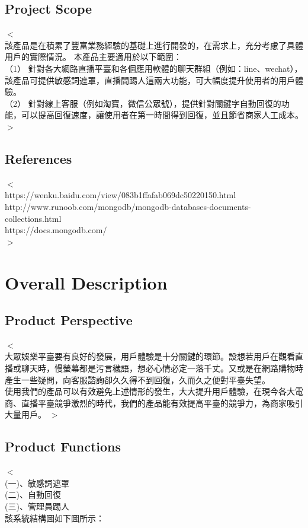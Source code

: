 \documentclass{scrreprt}
\begin{document}
\begin{CJK}{UTF8}{bkai}
\section{Project Scope}
$<$\\該產品是在積累了豐富業務經驗的基礎上進行開發的，在需求上，充分考慮了具體用戶的實際情況。 本產品主要適用於以下範圍：\\
（1）	針對各大網路直播平臺和各個應用軟體的聊天群組（例如：line、wechat），該產品可提供敏感詞遮罩，直播間踢人這兩大功能，可大幅度提升使用者的用戶體驗。\\
（2）	針對線上客服（例如淘寶，微信公眾號），提供針對關鍵字自動回復的功能，可以提高回復速度，讓使用者在第一時間得到回復，並且節省商家人工成本。\\
$>$

\section{References}
$<$\\
https://wenku.baidu.com/view/083b1ffafab069dc50220150.html\\
http://www.runoob.com/mongodb/mongodb-databases-documents-collections.html\\
https://docs.mongodb.com/\\
$>$


\chapter{Overall Description}

\section{Product Perspective}
$<$\\大眾娛樂平臺要有良好的發展，用戶體驗是十分關鍵的環節。設想若用戶在觀看直播或聊天時，慢螢幕都是污言穢語，想必心情必定一落千丈。又或是在網路購物時產生一些疑問，向客服諮詢卻久久得不到回復，久而久之便對平臺失望。\\
使用我們的產品可以有效避免上述情形的發生，大大提升用戶體驗，在現今各大電商、直播平臺競爭激烈的時代，我們的產品能有效提高平臺的競爭力，為商家吸引大量用戶。
$>$

\section{Product Functions}
$<$\\(一)、敏感詞遮罩 \\
(二)、自動回復  \\
(三)、管理員踢人  \\
該系統結構圖如下圖所示：



\end{CJK}
\end{document}
